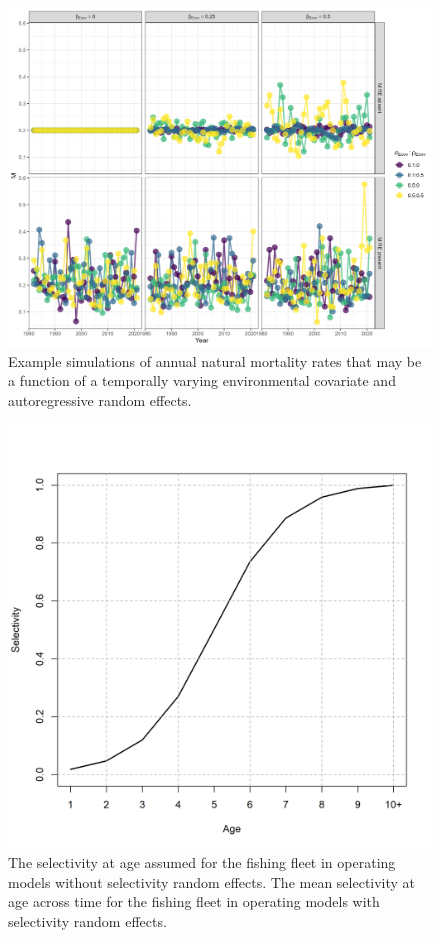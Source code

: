 \documentclass[
  12pt,
]{article}
\begin{document}
\begin{landscape}
\begin{figure}
\caption{Example simulations of annual natural mortality rates that may be a function of a temporally varying environmental covariate and autoregressive random effects.}\label{M_example}
\begin{center}
\includegraphics[width = \textwidth]{M_example.png}
\end{center}
\end{figure}
\end{landscape}

\begin{figure}
\caption{The selectivity at age assumed for the fishing fleet in operating models without selectivity random effects. The mean selectivity at age across time for the fishing fleet in operating models with selectivity random effects.}\label{om_mean_selectivity}
\begin{center}
\includegraphics[width = \textwidth]{om_mean_selectivity.png}
\end{center}
\end{figure}
\end{document}

